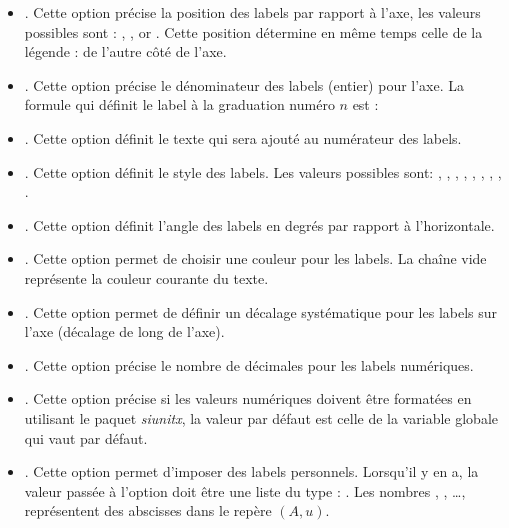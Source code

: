 \begin{itemize}
    \item {}. Cette option précise la position des labels par rapport à l'axe, les valeurs possibles sont : , , or . Cette position détermine en même temps celle de la légende : de l'autre côté de l'axe.
    
    \item {}. Cette option précise le dénominateur des labels (entier) pour l'axe. La formule qui définit le label à la graduation numéro $n$ est : 
    
    \item {}. Cette option définit le texte qui sera ajouté au numérateur des labels.
    
    \item {}. Cette option définit le style des labels. Les valeurs possibles sont: , , , , , , , , .
    
    \item {}. Cette option définit l'angle des labels en degrés par rapport à l'horizontale.
    
    \item {}. Cette option permet de choisir une couleur pour les labels. La chaîne vide représente la couleur courante du texte.
    
    \item {}. Cette option permet de définir un décalage systématique pour les labels sur l'axe (décalage de long de l'axe).
    
    \item {}. Cette option précise le nombre de décimales pour les labels numériques.
    
    \item {}. Cette option précise si les valeurs numériques doivent être formatées en utilisant le paquet \emph{siunitx}, la valeur par défaut est celle de la variable globale  qui vaut \false par défaut.
    
    \item {}. Cette option permet d'imposer des labels personnels. Lorsqu'il y en a, la valeur passée à l'option doit être une liste du type : . Les nombres , , \ldots, représentent des abscisses dans le repère $(A,u)$.
\end{itemize}

